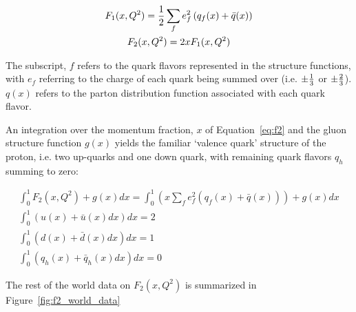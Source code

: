 \begin{gather}
  F_1(x,Q^2) = {1 \over 2}\sum_f e_f^2 \left(q_f(x)+\bar{q}(x)\right)
  \label{eq:f1} \\
  F_2(x,Q^2) = 2xF_1(x,Q^2)\label{eq:f2}
\end{gather}

The subscript, $f$ refers to the quark flavors represented in the structure
functions, with $e_f$ referring to the charge of each quark being summed over
(i.e. ${\pm}{1\over3}$ or ${\pm}{2\over3}$). $q(x)$ refers to the parton
distribution function associated with each quark flavor. 

An integration over the momentum fraction, $x$ of Equation~\ref{eq:f2} and the
gluon structure function $g(x)$ yields the familiar `valence quark' structure of
the proton, i.e. two up-quarks and one down quark, with remaining quark flavors
$q_h$ summing to zero:

\begin{gather}
	\int_0^1 F_2(x,Q^2) + g(x) dx 
	= \int_0^1 
	\left(
		x\sum_f e_f^2 \left(q_f(x)+\bar{q}(x)\right) 
	\right) 
	+ g(x) dx \label{eq:f2_int_1} \\
	\int_0^1 \left(u(x)+\bar{u}(x) dx \right) dx = 2  \label{eq:up_quark_valence} \\
	\int_0^1 \left(d(x)+\bar{d}(x) dx \right) dx = 1  \label{eq:down_quark_valence} \\
	\int_0^1 \left(q_h(x)+\bar{q}_h(x) dx \right) dx = 0 \label{eq:other_quark_valence}
\end{gather}

The rest of the world data on $F_2(x,Q^2)$ is summarized in
Figure~\ref{fig:f2_world_data}

